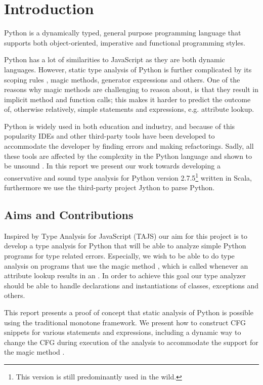\chapter{Introduction}
Python is a dynamically typed, general purpose programming language that supports both object-oriented, imperative and functional programming styles.

Python has a lot of similarities to JavaScript as they are both dynamic languages. However, static type analysis of Python is further complicated by its scoping rules \cite{lambdapy}, magic methods, generator expressions and others. One of the reasons why magic methods are challenging to reason about, is that they result in implicit method and function calls; this makes it harder to predict the outcome of, otherwise relatively, simple statements and expressions, e.g. attribute lookup.

Python is widely used in both education and industry, and because of this popularity IDEs \cite{ide.appcelerator, ide.jetbrains, ide.wingware} and other third-party tools \cite{tool.pep8, tool.pyflakes, tool.pychecker, tool.pylint} have been developed to accommodate the developer by finding errors and making refactorings. Sadly, all these tools are affected by the complexity in the Python language and shown to be unsound \cite{lamdapy}. In this report we present our work towards developing a conservative and sound type analysis for Python version 2.7.5\footnote{This version is still predominantly used in the wild.} written in Scala, furthermore we use the third-party project Jython \cite{jython} to parse Python.

\section{Aims and Contributions}
Inspired by Type Analysis for JavaScript (TAJS) \cite{tajs} our aim for this project is to develop a type analysis for Python that will be able to analyze simple Python programs for type related errors. Especially, we wish to be able to do type analysis on programs that use the magic method , which is called whenever an attribute lookup results in an . In order to achieve this goal our type analyzer should be able to handle declarations and instantiations of classes, exceptions and others.

This report presents a proof of concept that static analysis of Python is possible using the traditional monotone framework. We present how to construct CFG snippets for various statements and expressions, including a dynamic way to change the CFG during execution of the analysis to accommodate the support for the magic method .  

